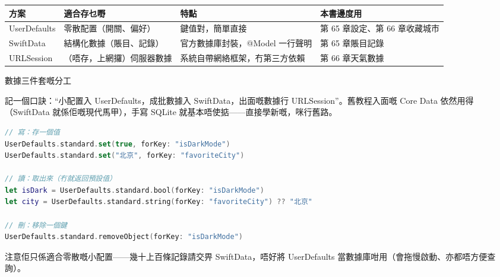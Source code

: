 


\begin{center}
\begin{tabularx}{\linewidth}{|X|X|X|X|}
\hline
\textbf{方案} & \textbf{適合存乜嘢} & \textbf{特點} & \textbf{本書邊度用} \tabularnewline
\hline
UserDefaults & 零散配置（開關、偏好） & 鍵值對，簡單直接 & 第 65 章設定、第 66 章收藏城市 \tabularnewline
SwiftData & 結構化數據（賬目、記錄） & 官方數據庫封裝，@Model 一行聲明 & 第 65 章賬目記錄 \tabularnewline
URLSession & （唔存，上網攞）伺服器數據 & 系統自帶網絡框架，冇第三方依賴 & 第 66 章天氣數據 \tabularnewline
\hline
\end{tabularx}
\end{center}

\begin{center}\small\color{gray}數據三件套嘅分工\end{center}

記一個口訣：“小配置入 UserDefaults，成批數據入 SwiftData，出面嘅數據行 URLSession”。舊教程入面嘅 Core Data 依然用得（SwiftData 就係佢嘅現代馬甲），手寫 SQLite 就基本唔使掂——直接學新嘅，咪行舊路。


\begin{lstlisting}[language=Swift]
// 寫：存一個值
UserDefaults.standard.set(true, forKey: "isDarkMode")
UserDefaults.standard.set("北京", forKey: "favoriteCity")

// 讀：取出來（冇就返回預設值）
let isDark = UserDefaults.standard.bool(forKey: "isDarkMode")
let city = UserDefaults.standard.string(forKey: "favoriteCity") ?? "北京"

// 刪：移除一個鍵
UserDefaults.standard.removeObject(forKey: "isDarkMode")
\end{lstlisting}

注意佢只係適合零散嘅小配置——幾十上百條記錄請交畀 SwiftData，唔好將 UserDefaults 當數據庫咁用（會拖慢啟動、亦都唔方便查詢）。


